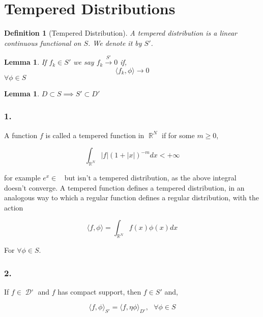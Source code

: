 \documentclass[12pt, a4]{article}
\newtheorem{definition}{Definition}[section]
\newtheorem{lemma}[theorem]{Lemma}
\DeclareMathOperator\reals{\mathbb{R}}
\DeclareMathOperator\dist{\mathcal{D'}}
\DeclareMathOperator\lone{L_{\text{loc}}^1}
\begin{document}
\section{Tempered Distributions}

\begin{definition}[Tempered Distribution]
    A tempered distribution is a linear continuous functional on $S$. We denote it by $S'$.
\end{definition}

\begin{lemma}
    If $f_k \in S'$ we say $f_k \overset{S'}{\rightarrow} 0$ if, \[ \langle f_k, \phi \rangle \rightarrow 0 \] $\forall \phi \in S$
\end{lemma}

\begin{lemma}
    $D \subset S \implies S' \subset D'$
\end{lemma}

\subsubsection*{1.}
A function $f$ is called a tempered function in $\reals^N$ if for some $m \geq 0$,

\begin{equation}
    \int_{\reals^N} |f| (1 + |x|)^{-m} dx < +\infty
\end{equation}

for example $e^x \in \lone$ but isn't a tempered distribution, as the above integral doesn't converge. A tempered function defines a tempered distribution, in an analogous way to which a regular function defines a regular distribution, with the action

\begin{equation}
    \langle f, \phi \rangle = \int_{\reals^N} f(x) \phi(x) dx
\end{equation}

For $\forall \phi \in S$.

\subsubsection*{2.}

If $f \in \dist$ and $f$ has compact support, then $f \in S'$ and,

\begin{equation}
    \langle f, \phi \rangle_{S'} = \langle f, \eta \phi \rangle_{D'}, \> \> \> \forall \phi \in S
\end{equation}
\end{document}
